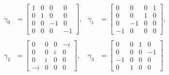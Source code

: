 \begin{align*}
    \gamma_0 &= \begin{bmatrix}
         1 &  0 &  0 &  0 \\
         0 &  1 &  0 &  0 \\
         0 &  0 & -1 &  0 \\
         0 &  0 &  0 & -1 
    \end{bmatrix}, &
    \gamma_1 &= \begin{bmatrix}
         0 &  0 &  0 &  1 \\
         0 &  0 &  1 &  0 \\
         0 & -1 &  0 &  0 \\
        -1 &  0 &  0 &  0 
    \end{bmatrix}, \\
    \\
    \gamma_2 &= \begin{bmatrix}
         0 &  0 &  0 & -i \\
         0 &  0 &  i &  0 \\
         0 &  i &  0 &  0 \\
        -i &  0 &  0 &  0 
    \end{bmatrix}, &
    \gamma_3 &= \begin{bmatrix}
         0 &  0 &  1 &  0 \\
         0 &  0 &  0 & -1 \\
        -1 &  0 &  0 &  0 \\
         0 &  1 &  0 &  0 
    \end{bmatrix}
\end{align*}
